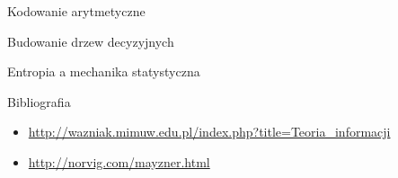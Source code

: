 \documentclass{beamer}
\begin{document}
\begin{frame}{Kodowanie arytmetyczne}
\end{frame}

\begin{frame}{Budowanie drzew decyzyjnych}
\end{frame}

\begin{frame}{Entropia a mechanika statystyczna}
\end{frame}

\begin{frame}{Bibliografia}
\begin{itemize}
  \item \url{http://wazniak.mimuw.edu.pl/index.php?title=Teoria_informacji}
  \item \url{http://norvig.com/mayzner.html}
\end{itemize}
\end{frame}
\end{document}
